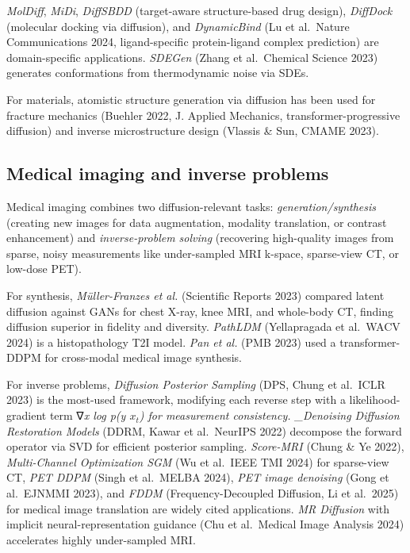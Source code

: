 \emph{MolDiff}, \emph{MiDi}, \emph{DiffSBDD} (target-aware structure-based drug design), \emph{DiffDock} (molecular docking via diffusion), and \emph{DynamicBind} (Lu et al.~Nature Communications 2024, ligand-specific protein-ligand complex prediction) are domain-specific applications. \emph{SDEGen} (Zhang et al.~Chemical Science 2023) generates conformations from thermodynamic noise via SDEs.

For materials, atomistic structure generation via diffusion has been used for fracture mechanics (Buehler 2022, J. Applied Mechanics, transformer-progressive diffusion) and inverse microstructure design (Vlassis \& Sun, CMAME 2023).

\subsection{Medical imaging and inverse problems}\label{medical-imaging-and-inverse-problems}

Medical imaging combines two diffusion-relevant tasks: \emph{generation/synthesis} (creating new images for data augmentation, modality translation, or contrast enhancement) and \emph{inverse-problem solving} (recovering high-quality images from sparse, noisy measurements like under-sampled MRI k-space, sparse-view CT, or low-dose PET).

For synthesis, \emph{Müller-Franzes et al.} (Scientific Reports 2023) compared latent diffusion against GANs for chest X-ray, knee MRI, and whole-body CT, finding diffusion superior in fidelity and diversity. \emph{PathLDM} (Yellapragada et al.~WACV 2024) is a histopathology T2I model. \emph{Pan et al.} (PMB 2023) used a transformer-DDPM for cross-modal medical image synthesis.

For inverse problems, \emph{Diffusion Posterior Sampling} (DPS, Chung et al.~ICLR 2023) is the most-used framework, modifying each reverse step with a likelihood-gradient term ∇\emph{x log p(y \textbar{} \(x_t\)) for measurement consistency. \_Denoising Diffusion Restoration Models} (DDRM, Kawar et al.~NeurIPS 2022) decompose the forward operator via SVD for efficient posterior sampling. \emph{Score-MRI} (Chung \& Ye 2022), \emph{Multi-Channel Optimization SGM} (Wu et al.~IEEE TMI 2024) for sparse-view CT, \emph{PET DDPM} (Singh et al.~MELBA 2024), \emph{PET image denoising} (Gong et al.~EJNMMI 2023), and \emph{FDDM} (Frequency-Decoupled Diffusion, Li et al.~2025) for medical image translation are widely cited applications. \emph{MR Diffusion} with implicit neural-representation guidance (Chu et al.~Medical Image Analysis 2024) accelerates highly under-sampled MRI.


